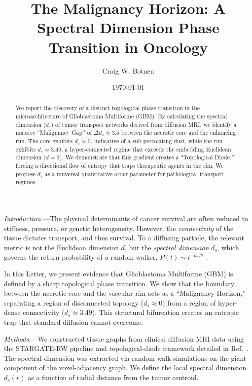 \documentclass[aps,prl,twocolumn,superscriptaddress,showpacs,10pt]{revtex4-2}
\begin{document}
\title{The Malignancy Horizon: A Spectral Dimension Phase Transition in Oncology}

\author{Craig W. Botnen}

\date{\today}

\begin{abstract}
We report the discovery of a distinct topological phase transition in the microarchitecture of Glioblastoma Multiforme (GBM). By calculating the spectral dimension ($d_s$) of tumor transport networks derived from diffusion MRI, we identify a massive ``Malignancy Gap'' of $\Delta d_s \approx 3.5$ between the necrotic core and the enhancing rim. The core exhibits $d_s \approx 0$, indicative of a sub-percolating dust, while the rim exhibits $d_s \approx 3.49$, a hyper-connected regime that exceeds the embedding Euclidean dimension ($d=3$). We demonstrate that this gradient creates a ``Topological Diode,'' forcing a directional flow of entropy that traps therapeutic agents in the rim. We propose $d_s$ as a universal quantitative order parameter for pathological transport regimes.
\end{abstract}

\maketitle

\textit{Introduction.}---The physical determinants of cancer survival are often reduced to stiffness, pressure, or genetic heterogeneity. However, the \textit{connectivity} of the tissue dictates transport, and thus survival. To a diffusing particle, the relevant metric is not the Euclidean dimension $d$, but the \textit{spectral dimension} $d_s$, which governs the return probability of a random walker, $P(t) \sim t^{-d_s/2}$ \cite{Alexander1982}.

In this Letter, we present evidence that Glioblastoma Multiforme (GBM) is defined by a sharp topological phase transition. We show that the boundary between the necrotic core and the vascular rim acts as a ``Malignancy Horizon,'' separating a region of disconnected topology ($d_s \approx 0$) from a region of hyper-dense connectivity ($d_s \approx 3.49$). This structural bifurcation creates an entropic trap that standard diffusion cannot overcome.

\textit{Methods.}---We constructed tissue graphs from clinical diffusion MRI data using the STARGATE-RW pipeline and topological-diode framework detailed in Ref.~\cite{PRE_Paper}. The spectral dimension was extracted via random walk simulations on the giant component of the voxel-adjacency graph. We define the local spectral dimension $d_s(r)$ as a function of radial distance from the tumor centroid.
\end{document}
